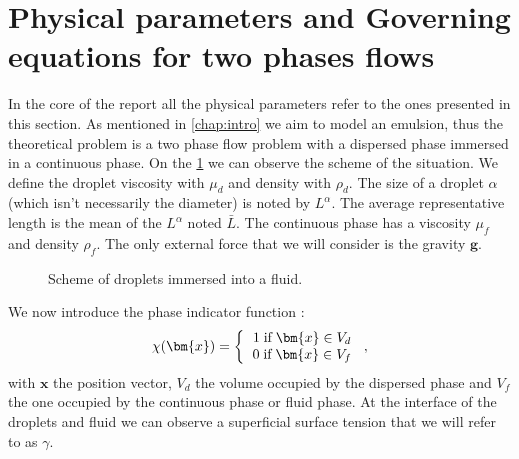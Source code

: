 \section{Physical parameters and Governing equations for two phases flows}
In the core of the report all the physical parameters refer to the ones presented in this section.
As mentioned in \ref{chap:intro} we aim to model an emulsion, thus the theoretical problem is a two phase flow problem with a dispersed phase immersed in a continuous phase. 
On the \ref{fig:scheme} we can observe the scheme of the situation. 
We define the droplet viscosity with $\mu_d$ and density with $\rho_d$.
The size  of a droplet  $\alpha$ (which isn't necessarily the diameter) is noted by $L^\alpha$. 
The average representative length is the mean of the $L^\alpha$ noted $\bar{L}$. 
The continuous phase has a viscosity $\mu_f$ and density $\rho_f$.
The only external force that we will consider is the gravity $\bm{g}$. 
\begin{figure}
    \centering
    \caption{Scheme of droplets immersed into a fluid.}
    \label{fig:scheme}
\end{figure}
We now introduce the phase indicator function :
\begin{equation}
    \chi(\bm{x}) = \left\lbrace \begin{tabular}{c}
        $1 \;\text{if}\; \bm{x} \in V_d$\\
        $0 \;\text{if}\; \bm{x} \in V_f$\\
    \end{tabular}\right.,
\end{equation}
with $\bm{x}$ the position vector, $V_d$ the volume occupied by the dispersed phase and $V_f$ the one occupied by the continuous phase or fluid phase. 
At the interface of the droplets and fluid we can observe a superficial surface tension that we will refer to as $\gamma$.

